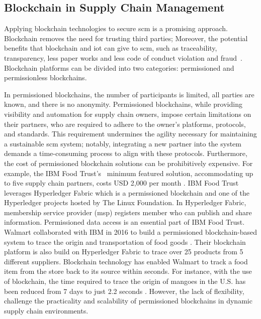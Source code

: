 \subsection{Blockchain in Supply Chain Management}

Applying blockchain technologies to secure \gls{scm} is a promising approach. Blockchain removes the need for trusting third parties; Moreover, the potential benefits that blockchain and \gls{iot} can give to \gls{scm}, such as traceability, transparency, less paper works and less code of conduct violation and fraud~\cite{Aich2019}.  Blockchain platforms can be divided into two categories: permissioned and permissionless blockchains. 

In permissioned blockchains, the number of participants is limited, all parties are known, and there is no anonymity. Permissioned blockchains, while providing visibility and automation for supply chain owners, impose certain limitations on their partners, who are required to adhere to the owner's platforms, protocols, and standards. This requirement undermines the agility necessary for maintaining a sustainable \gls{scm} system; notably, integrating a new partner into the system demands a time-consuming process to align with these protocols. Furthermore, the cost of permissioned blockchain solutions can be prohibitively expensive. For example, the IBM Food Trust's~\cite{IBM-SCM}  minimum featured solution, accommodating up to five supply chain partners, costs USD 2,000 per month \cite{IBMFoodTrust}. 
 IBM Food Trust leverages Hyperledger Fabric \cite{Fabric} which is a permissioned blockchain and one of the Hyperledger projects hosted by The Linux Foundation. In Hyperledger Fabric, membership service provider (\gls{msp}) registers member who can publish and share information. Permissioned data access is an essential part of IBM Food Trust. Walmart collaborated with IBM in 2016 to build a permissioned blockchain-based system to trace the origin and transportation of food goods \cite{HELO2019242}. Their blockchain platform is also build on Hyperledger Fabric to trace over 25 products from 5 different suppliers. Blockchain technology has enabled Walmart to track a food item from the store back to its source within seconds. For instance, with the use of blockchain, the time required to trace the origin of mangoes in the U.S. has been reduced from 7 days to just 2.2 seconds \cite{Walmart}.  However, the lack of flexibility, challenge the practicality and scalability of permissioned blockchains in dynamic supply chain environments.


